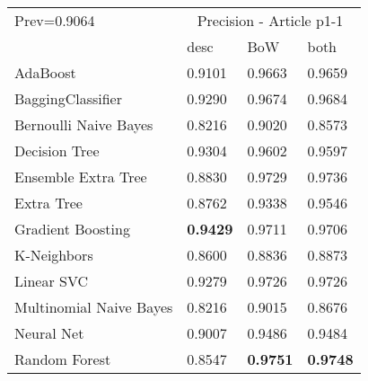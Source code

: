 \begin{tabular}{|l|l|l|l| }
\hline
Prev=0.9064 &  \multicolumn{3}{c|}{Precision - Article p1-1} \\
\cline{2-4} & desc & BoW & both \\ \hline
AdaBoost                & 0.9101 & 0.9663 & 0.9659\\
BaggingClassifier       & 0.9290 & 0.9674 & 0.9684\\
Bernoulli Naive Bayes   & 0.8216 & 0.9020 & 0.8573\\
Decision Tree           & 0.9304 & 0.9602 & 0.9597\\
Ensemble Extra Tree     & 0.8830 & 0.9729 & 0.9736\\
Extra Tree              & 0.8762 & 0.9338 & 0.9546\\
Gradient Boosting       & {\bf 0.9429} & 0.9711 & 0.9706\\
K-Neighbors             & 0.8600 & 0.8836 & 0.8873\\
Linear SVC              & 0.9279 & 0.9726 & 0.9726\\
Multinomial Naive Bayes & 0.8216 & 0.9015 & 0.8676\\
Neural Net              & 0.9007 & 0.9486 & 0.9484\\
Random Forest           & 0.8547 & {\bf 0.9751} & {\bf 0.9748}\\
\hline
\end{tabular}